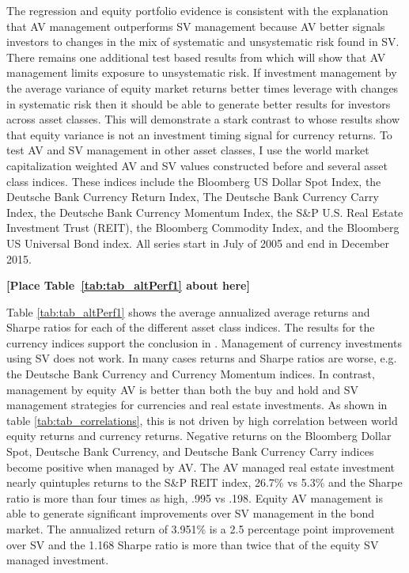 The regression and equity portfolio evidence is consistent with the explanation that AV management outperforms SV management because AV better signals investors to changes in the mix of systematic and unsystematic risk found in SV. There remains one additional test based results from \citet{moreira_volatility-managed_2017} which will show that AV management limits exposure to unsystematic risk. If investment management by the average variance of equity market returns better times leverage with changes in systematic risk then it should be able to generate better results for investors across asset classes. This will demonstrate a stark contrast to \citet{moreira_volatility-managed_2017} whose results show that equity variance is not an investment timing signal for currency returns. To test AV and SV management in other asset classes, I use the world market capitalization weighted AV and SV values constructed before and several asset class indices. These indices include the Bloomberg US Dollar Spot Index, the Deutsche Bank Currency Return Index, The Deutsche Bank Currency Carry Index, the Deutsche Bank Currency Momentum Index, the S\&P U.S. Real Estate Investment Trust (REIT), the Bloomberg Commodity Index, and the Bloomberg US Universal Bond index. All series start in July of 2005 and end in December 2015.

\bigskip
\centerline{\bf [Place Table~\ref{tab:tab_altPerf1} about here]}
\bigskip

Table \ref{tab:tab_altPerf1} shows the average annualized average returns and Sharpe ratios for each of the different asset class indices. The results for the currency indices support the conclusion in \citet{moreira_volatility-managed_2017}. Management of currency investments using SV does not work. In many cases returns and Sharpe ratios are worse, e.g. the Deutsche Bank Currency and Currency Momentum indices. In contrast, management by equity AV is better than both the buy and hold and SV management strategies for currencies and real estate investments. As shown in table \ref{tab:tab_correlations}, this is not driven by high correlation between world equity returns and currency returns. Negative returns on the Bloomberg Dollar Spot, Deutsche Bank Currency, and Deutsche Bank Currency Carry indices become positive when managed by AV. The AV managed real estate investment nearly quintuples returns to the S\&P REIT index, 26.7\% vs 5.3\% and the Sharpe ratio is more than four times as high, .995 vs .198. Equity AV management is able to generate significant improvements over SV management in the bond market. The annualized return of 3.951\% is a 2.5 percentage point improvement over SV and the 1.168 Sharpe ratio is more than twice that of the equity SV managed investment.

